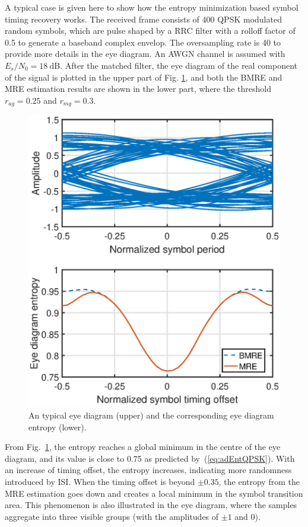 \documentclass[journal,comsoc, onecolumn, 12pt,draftclsnofoot]{IEEEtran} %
\begin{document}
A typical case is given here to show how the entropy minimization based symbol timing recovery works.
The received frame consists of 400 QPSK modulated random symbols, 
which are pulse shaped by a RRC filter with a rolloff factor of 0.5 to generate a baseband complex envelop.
The oversampling rate is 40 to provide more details in the eye diagram.
An AWGN channel is assumed with $E_s/N_0 = 18~\text{dB}$. 
After the matched filter, the eye diagram of the real component of the signal is plotted in the upper part of Fig. \ref{fig:timing}, and both the BMRE and MRE estimation results are shown in the lower part,
where the threshold $r_{ag}=0.25$ and \(r_{mg}=0.3\).


\begin{figure}[htbp]
\centering
\includegraphics[width=3 in]{pic/timing.eps}
\caption{An typical eye diagram (upper) and the corresponding eye diagram entropy (lower).}
\label{fig:timing} 
\end{figure}

From Fig.~\ref{fig:timing}, the entropy reaches a global minimum in the centre of the eye diagram, and its value is close to 0.75 as predicted by~(\ref{eq:adEntQPSK}).
With an increase of timing offset, the entropy increases, indicating  more randomness introduced by ISI.
When the timing offset is beyond $\pm 0.35$, the  entropy from the MRE estimation goes down and creates a local minimum in the symbol transition area. 
This phenomenon is also illustrated in the eye diagram, where the samples aggregate into three visible groups (with the amplitudes of \(\pm 1\) and 0).
\end{document}
